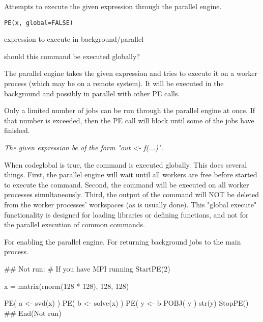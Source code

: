 \begin{Description}\relax
Attempts to execute the given expression through the parallel engine.
\end{Description}
\begin{Usage}
\begin{verbatim}
PE(x, global=FALSE)
\end{verbatim}
\end{Usage}
\begin{Arguments}
\begin{ldescription}
\item[\code{x}] expression to execute in background/parallel 
\item[\code{global}] should this command be executed globally? 
\end{ldescription}
\end{Arguments}
\begin{Details}\relax
The parallel engine takes the given expression and tries to execute it
on a worker process (which may be on a remote system).  It will be
executed in the background and possibly in parallel with other PE calls.

Only a limited number of jobs can be run through the parallel engine at
once.  If that number is exceeded, then the PE call will block until some
of the jobs have finished.

\emph{The given expression  be of the form "out <- f(...)".}

When code{global} is true, the command is executed globally.  This does
several things.  First, the parallel engine will wait until all workers
are free before started to execute the command.  Second, the command will
be executed on all worker processes simultaneously.  Third, the output of
the command will NOT be deleted from the worker processes' workspaces (as
is usually done).  This "global execute" functionality is designed for
loading libraries or defining functions, and not for the parallel
execution of common commands.
\end{Details}
\begin{SeeAlso}\relax
{}  For enabling the parallel engine.
  For returning background jobs to the main process.
\end{SeeAlso}
\begin{Examples}
\begin{ExampleCode}
## Not run: 
# If you have MPI running
StartPE(2)

x = matrix(rnorm(128 * 128), 128, 128)

PE( a <- svd(x) )
PE( b <- solve(x) )
PE( y <- b %
POBJ( y )
str(y)
StopPE()
## End(Not run)
\end{ExampleCode}
\end{Examples}

